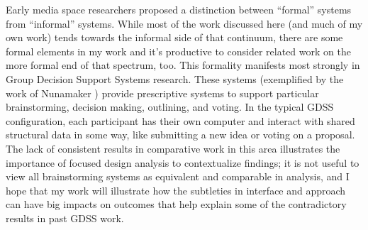 \documentclass{tufte-handout}
\begin{document}
Early media space researchers proposed a distinction between ``formal'' systems from ``informal'' systems. \cite{olsen_bly_portland} While most of the work discussed here (and much of my own work) tends towards the informal side of that continuum, there are some formal elements in my work and it's productive to consider related work on the more formal end of that spectrum, too. This formality manifests most strongly in Group Decision Support Systems research. These systems (exemplified by the work of Nunamaker \cite{nunamaker_gdss}) provide prescriptive systems to support particular brainstorming, decision making, outlining, and voting. In the typical GDSS configuration, each participant has their own computer and interact with shared structural data in some way, like submitting a new idea or voting on a proposal. The lack of consistent results in comparative work in this area \cite{dennis_results_summary} illustrates the importance of focused design analysis to contextualize findings; it is not useful to view all brainstorming systems as equivalent and comparable in analysis, and I hope that my work will illustrate how the subtleties in interface and approach can have big impacts on outcomes that help explain some of the contradictory results in past GDSS work.














\end{document}
